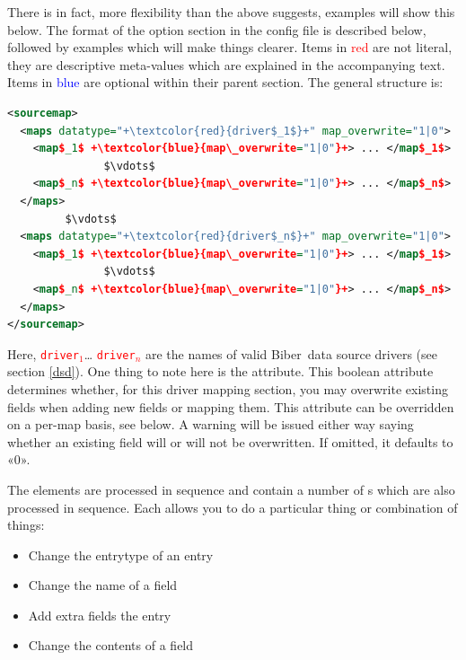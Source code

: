 \documentclass{ltxdockit}
\newcommand*{\biber}{Biber\xspace}
\begin{document}
\noindent There is in fact, more flexibility than the above suggests,
examples will show this below. The format of the  option
section in the config file is described below, followed by examples which
will make things clearer. Items in \textcolor{red}{red} are not literal,
they are descriptive meta-values which are explained in the accompanying
text. Items in \textcolor{blue}{blue} are optional within their parent
section. The general structure is:

\lstset{showspaces=false}
\lstset{showstringspaces=false}
\begin{lstlisting}[language=xml,escapechar=+,mathescape=true]
<sourcemap>
  <maps datatype="+\textcolor{red}{driver$_1$}+" map_overwrite="1|0">
    <map$_1$ +\textcolor{blue}{map\_overwrite="1|0"}+> ... </map$_1$>
               $\vdots$
    <map$_n$ +\textcolor{blue}{map\_overwrite="1|0"}+> ... </map$_n$>
  </maps>
         $\vdots$
  <maps datatype="+\textcolor{red}{driver$_n$}+" map_overwrite="1|0">
    <map$_1$ +\textcolor{blue}{map\_overwrite="1|0"}+> ... </map$_1$>
               $\vdots$
    <map$_n$ +\textcolor{blue}{map\_overwrite="1|0"}+> ... </map$_n$>
  </maps>
</sourcemap>
\end{lstlisting}

\noindent Here, \textcolor{red}{\texttt{driver$_1$}}\ldots
\textcolor{red}{\texttt{driver$_n$}} are the names of valid \biber\ data
source drivers (see section \ref{dsd}). One thing to note here is the
 attribute. This boolean attribute determines whether,
for this driver mapping section, you may overwrite existing fields when
adding new fields or mapping them. This attribute can be overridden on a
per-map basis, see below. A warning will be issued either way saying
whether an existing field will or will not be overwritten. If omitted, it
defaults to «0».

The  elements are processed in sequence and contain a number of
s which are also processed in sequence. Each 
allows you to do a particular thing or combination of things:

\begin{itemize}
\item Change the entrytype of an entry
\item Change the name of a field
\item Add extra fields the entry
\item Change the contents of a field
\end{itemize}
\end{document}
